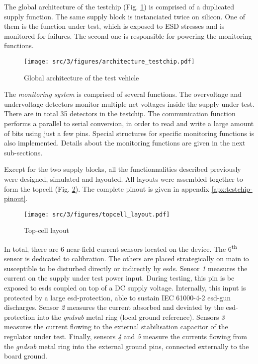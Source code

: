 The global architecture of the testchip (Fig. \ref{architecture_testchip}) is comprised of a duplicated supply function.
The same supply block is instanciated twice on silicon.
One of them is the function under test, which is exposed to \gls{ESD} stresses and is monitored for failures.
The second one is responsible for powering the monitoring functions.

\begin{figure}[h]
  \centering
  \texttt{[image: src/3/figures/architecture\_testchip.pdf]}
  \caption{Global architecture of the test vehicle}
  \label{architecture_testchip}
\end{figure}

The \textit{monitoring system} is comprised of several functions.
The overvoltage and undervoltage detectors monitor multiple net voltages inside the supply under test.
There are in total 35 detectors in the testchip.
The communication function performs a parallel to serial conversion, in order to read and write a large amount of bits using just a few pins.
Special structures for specific monitoring functions is also implemented.
Details about the monitoring functions are given in the next sub-sections.

Except for the two supply blocks, all the functionnalities described previously were designed, simulated and layouted.
All layouts were assembled together to form the topcell (Fig. \ref{fig:top-cell-layout}).
The complete pinout is given in appendix \ref{apx:testchip-pinout}.

\begin{figure}[!h]
  \centering
  \texttt{[image: src/3/figures/topcell\_layout.pdf]}
  \caption{Top-cell layout}
  \label{fig:top-cell-layout}
\end{figure}

In total, there are 6 near-field current sensors located on the device.
The 6\textsuperscript{th} sensor is dedicated to calibration.
The others are placed strategically on main \gls{io} susceptible to be disturbed directly or indirectly by \gls{esd}s.
Sensor \textit{1} measures the current on the supply under test power input.
During testing, this pin is be exposed to \gls{esd}s coupled on top of a DC supply voltage.
Internally, this input is protected by a large \gls{esd-protection}, able to sustain IEC 61000-4-2 \gls{esd-gun} discharges.
Sensor \textit{2} measures the current absorbed and deviated by the \gls{esd-protection} into the \textit{gndsub} metal ring (local ground reference).
Sensors \textit{3} measures the current flowing to the external stabilisation capacitor of the regulator under test.
Finally, sensors \textit{4} and \textit{5} measure the currents flowing from the \textit{gndsub} metal ring into the external ground pins, connected externally to the board ground.

